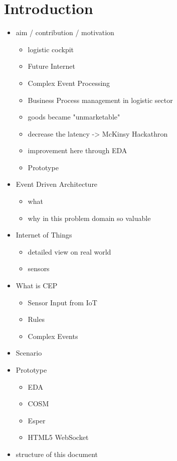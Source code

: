 \documentclass{acm_proc_article-sp}
\begin{document}
\section{Introduction}

\begin{itemize}
	\item aim / contribution / motivation
		\begin{itemize}
			\item logistic cockpit
			\item Future Internet
			\item Complex Event Processing
			\item Business Process management in logistic sector
			\item goods became "unmarketable"
			\item decrease the latency -> McKinsy Hackathron
			\item improvement here through EDA
			\item Prototype
		\end{itemize}
	\item Event Driven Architecture
		\begin{itemize}
			\item what
			\item why in this problem domain so valuable 
		\end{itemize}
	\item Internet of Things
		\begin{itemize}
			\item detailed view on real world
			\item sensors
		\end{itemize}
	\item What is CEP
		\begin{itemize}
			\item Sensor Input from IoT
			\item Rules
			\item Complex Events
		\end{itemize}
	\item Scenario
	\item Prototype
			\begin{itemize}
				\item EDA
				\item COSM
				\item Esper
				\item HTML5 WebSocket
			\end{itemize}			
		
\item structure of this document								 
\end{itemize}
\end{document}
